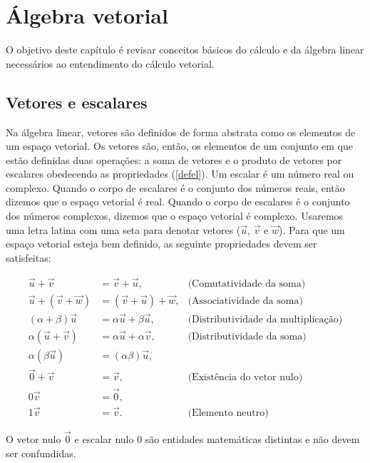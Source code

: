 
\chapter{Álgebra vetorial}\label{chap:algvet}
O objetivo deste capítulo é revisar conceitos básicos do cálculo e da álgebra linear necessários ao entendimento do cálculo vetorial.


\section{Vetores e escalares}
Na álgebra linear, vetores são definidos de forma abstrata como os elementos de um espaço vetorial. Os vetores são, então, os elementos de um conjunto em que estão definidas duas operações: a soma de vetores e o produto de vetores por escalares obedecendo as propriedades (\ref{defel}). Um escalar é um número real ou complexo. Quando o corpo de escalares é o conjunto dos números reais, então dizemos que o espaço vetorial é real. Quando o corpo de escalares é o conjunto dos números complexos, dizemos que o espaço vetorial é complexo. Usaremos uma letra latina com uma seta para denotar vetores ($\vec{u}$, $\vec{v}$ e $\vec{w}$).  Para que um espaço vetorial esteja bem definido, as seguinte propriedades devem ser satisfeitas:

\begin{subequations}\label{defel}
\begin{align}
\vec{u}+\vec{v}&=\vec{v}+\vec{u},&\text{(Comutatividade da soma)}\label{defelcom}\\
\vec{u}+\left(\vec{v}+\vec{w}\right)&=\left(\vec{v}+\vec{u}\right)+\vec{w},&\text{(Associatividade da soma)}\label{defelass}\\
\left(\alpha+\beta\right) \vec{u}&=\alpha\vec{u}+\beta\vec{u},&\text{(Distributividade da multiplicação)}\label{defeldist1}\\
\alpha \left(\vec{u}+\vec{v}\right)&= \alpha \vec{u}+\alpha\vec{v},&\text{(Distributividade da soma)}\label{defeldist2}\\
\alpha \left(\beta\vec{u}\right)&=\left(\alpha\beta\right)\vec{u},\label{defeldist3}\\
\vec{0}+\vec{v}&=\vec{v}, &\text{(Existência do vetor nulo)}\label{defelnulo}\\
0\vec{v}&=\vec{0},\label{defelnulo2}\\
1\vec{v}&=\vec{v}.&\text{(Elemento neutro)}\label{defelneutro}
\end{align}
\end{subequations}
\begin{obs} O vetor nulo $\vec{0}$ e escalar nulo $0$ são entidades matemáticas distintas e não devem ser confundidas.\end{obs}

